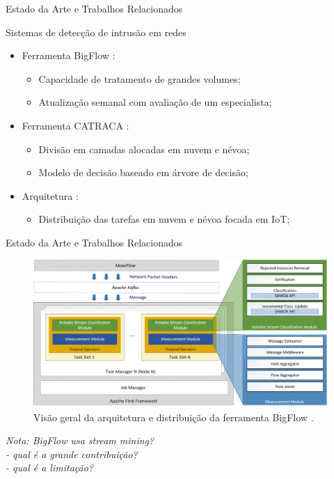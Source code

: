 \documentclass[aspectratio=43,10pt]{beamer}
\newcommand{\nota}[1]{\hspace*{-0.5cm}\textit{{\color[rgb]{1,0,0}Nota: #1}}}
\begin{document}
\begin{frame}[fragile]{Estado da Arte e Trabalhos Relacionados}
\begin{alertblock}{Sistemas de detecção de intrusão em redes}
  \begin{itemize}
    \item Ferramenta BigFlow \cite{Viegas2019}:
    \begin{itemize}
      \item Capacidade de tratamento de grandes volumes;
      \item Atualização semanal com avaliação de um especialista;
    \end{itemize}
    \item Ferramenta CATRACA \cite{Lopez2018}:
    \begin{itemize}
      \item Divisão em camadas alocadas em nuvem e névoa;
      \item Modelo de decisão baseado em árvore de decisão;
    \end{itemize}
    \item Arquitetura \idsiot \cite{Cassales2019a}:
    \begin{itemize}
      \item Distribuição das tarefas em nuvem e névoa focada em IoT;
    \end{itemize}
  \end{itemize}
\end{alertblock}
\end{frame}

\begin{frame}[fragile]{Estado da Arte e Trabalhos Relacionados}
\begin{figure}[ht]
  \centering
  \includegraphics[width=\textwidth]{figuras/bigflow-fig5-bigflow_arch.png}
  \caption{Visão geral da arquitetura e distribuição da ferramenta BigFlow \cite{Viegas2019}.}
  \label{fig:bigflow-arch}
\end{figure}
\nota{BigFlow usa stream mining?\\
- qual é a grande contribuição?\\
- qual é a limitação?}
\end{frame}
\end{document}
